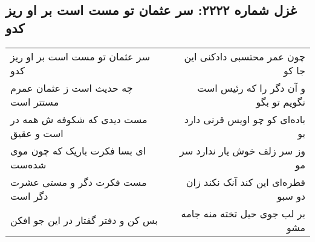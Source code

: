 \begin{center}
\section*{غزل شماره ۲۲۲۲: سر عثمان تو مست است بر او ریز کدو}
\label{sec:2222}
\begin{longtable}{l p{0.5cm} r}
سر عثمان تو مست است بر او ریز کدو
&&
چون عمر محتسبی دادکنی این جا کو
\\
چه حدیث است ز عثمان عمرم مستتر است
&&
و آن دگر را که رئیس است نگویم تو بگو
\\
مست دیدی که شکوفه ش همه در است و عقیق
&&
باده‌ای کو چو اویس قرنی دارد بو
\\
ای بسا فکرت باریک که چون موی شده‌ست
&&
وز سر زلف خوش یار ندارد سر مو
\\
مست فکرت دگر و مستی عشرت دگر است
&&
قطره‌ای این کند آنک نکند زان دو سبو
\\
بس کن و دفتر گفتار در این جو افکن
&&
بر لب جوی حیل تخته منه جامه مشو
\\
\end{longtable}
\end{center}
